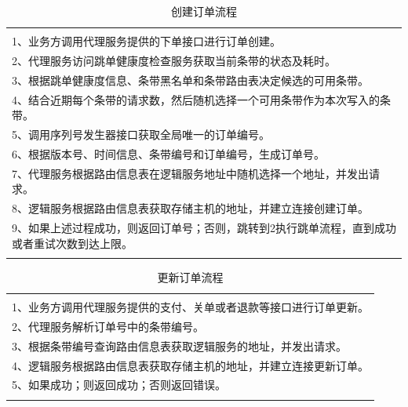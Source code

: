 \documentclass[letterpaper,twocolumn,10pt]{article}
\begin{document}
\begin{table}[htp]
\caption{创建订单流程}
\begin{center}
\begin{tabular}{l}
\hline
\\
1、业务方调用代理服务提供的下单接口进行订单创建。\\
2、代理服务访问跳单健康度检查服务获取当前条带的状态及耗时。 \\
3、根据跳单健康度信息、条带黑名单和条带路由表决定候选的可用条带。\\
4、结合近期每个条带的请求数，然后随机选择一个可用条带作为本次写入的条带。\\
5、调用序列号发生器接口获取全局唯一的订单编号。 \\
6、根据版本号、时间信息、条带编号和订单编号，生成订单号。\\
7、代理服务根据路由信息表在逻辑服务地址中随机选择一个地址，并发出请求。\\
8、逻辑服务根据路由信息表获取存储主机的地址，并建立连接创建订单。\\
9、如果上述过程成功，则返回订单号；否则，跳转到2执行跳单流程，直到成功或者重试次数到达上限。\\
\\
\hline
\end{tabular}
\end{center}
\label{create}
\end{table}%


\begin{table}[htp]
\caption{更新订单流程}
\begin{center}
\begin{tabular}{l}
\hline
\\
1、业务方调用代理服务提供的支付、关单或者退款等接口进行订单更新。\\
2、代理服务解析订单号中的条带编号。 \\
3、根据条带编号查询路由信息表获取逻辑服务的地址，并发出请求。 \\
4、逻辑服务根据路由信息表获取存储主机的地址，并建立连接更新订单。\\
5、如果成功；则返回成功；否则返回错误。\\
\\
\hline
\end{tabular}
\end{center}
\label{update}
\end{table}%
\end{document}
